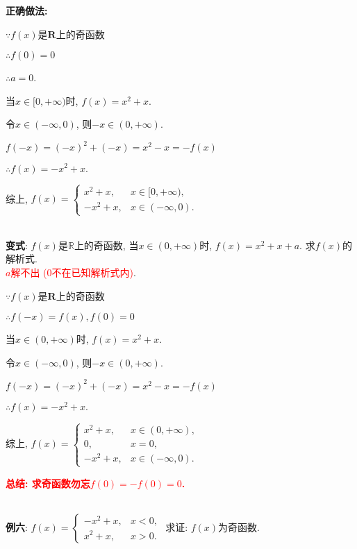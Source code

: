 \documentclass[8pt]{article}
\begin{document}
					\textbf{正确做法:}

					$\because f(x)$是$\textbf{R}$上的奇函数

					$\therefore f(0)=0$

					$\therefore a=0$.

					当$x\in[0, +\infty)$时, $f(x)=x^2+x$.

					令$x\in(-\infty, 0)$, 则$-x\in(0, +\infty)$.

					$f(-x) = (-x)^2 + (-x) = x^2 - x = -f(x)$

					$\therefore f(x)=-x^2+x.$

					综上, $\displaystyle f(x)=\left\{\begin{array}{rl}x^2+x, &x\in[0, +\infty),\\-x^2+x, &x\in(-\infty, 0).\end{array}\right.$

					~\\

					\textbf{变式}: $f(x)$是$\mathbb{R}$上的奇函数, 当$x\in (0, +\infty)$时, $f(x)=x^2+x+a$. 求$f(x)$的解析式.
					~\\

					\textcolor{red}{$a$解不出 (0不在已知解析式内)}.

					$\because f(x)$是$\textbf{R}$上的奇函数

					$\therefore f(-x)=f(x), f(0)=0$

					当$x\in(0, +\infty)$时, $f(x)=x^2+x$.

					令$x\in(-\infty, 0)$, 则$-x\in(0, +\infty)$.

					$f(-x) = (-x)^2 + (-x) = x^2 - x = -f(x)$

					$\therefore f(x)=-x^2+x.$

					综上, $\displaystyle f(x)=\left\{\begin{array}{rl}x^2+x, &x\in(0, +\infty),\\0, &x=0,\\-x^2+x, &x\in(-\infty, 0).\end{array}\right.$

					\textbf{\textcolor{red}{总结: 求奇函数勿忘$f(0)=-f(0)=0$.}}

				~\\

				\textbf{例六}: $f(x) = \left\{\begin{array}{rl}-x^2+x,& x<0,\\ x^2+x, &x>0.\end{array}\right.$ 求证: $f(x)$为奇函数.
					~\\
\end{document}
